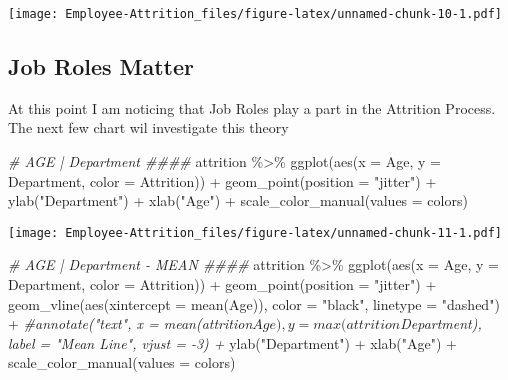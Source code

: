 \documentclass[
]{article}
\newenvironment{Shaded}{\begin{snugshade}}{\end{snugshade}}
\newcommand{\AttributeTok}[1]{\textcolor[rgb]{0.77,0.63,0.00}{#1}}
\newcommand{\CommentTok}[1]{\textcolor[rgb]{0.56,0.35,0.01}{\textit{#1}}}
\newcommand{\FunctionTok}[1]{\textcolor[rgb]{0.00,0.00,0.00}{#1}}
\newcommand{\NormalTok}[1]{#1}
\newcommand{\SpecialCharTok}[1]{\textcolor[rgb]{0.00,0.00,0.00}{#1}}
\newcommand{\StringTok}[1]{\textcolor[rgb]{0.31,0.60,0.02}{#1}}
\begin{document}
\texttt{[image: Employee-Attrition\_files/figure-latex/unnamed-chunk-10-1.pdf]}

\hypertarget{job-roles-matter}{%
\subsection{Job Roles Matter}\label{job-roles-matter}}

At this point I am noticing that Job Roles play a part in the Attrition
Process. The next few chart wil investigate this theory

\begin{Shaded}
\begin{Highlighting}[]
\CommentTok{\# AGE | Department \#\#\#\#}
\NormalTok{attrition }\SpecialCharTok{\%\textgreater{}\%} \FunctionTok{ggplot}\NormalTok{(}\FunctionTok{aes}\NormalTok{(}\AttributeTok{x =}\NormalTok{ Age, }\AttributeTok{y =}\NormalTok{ Department, }\AttributeTok{color =}\NormalTok{ Attrition)) }\SpecialCharTok{+}
  \FunctionTok{geom\_point}\NormalTok{(}\AttributeTok{position =} \StringTok{"jitter"}\NormalTok{) }\SpecialCharTok{+}
  \FunctionTok{ylab}\NormalTok{(}\StringTok{"Department"}\NormalTok{) }\SpecialCharTok{+}
  \FunctionTok{xlab}\NormalTok{(}\StringTok{"Age"}\NormalTok{) }\SpecialCharTok{+}
  \FunctionTok{scale\_color\_manual}\NormalTok{(}\AttributeTok{values =}\NormalTok{ colors)}
\end{Highlighting}
\end{Shaded}

\texttt{[image: Employee-Attrition\_files/figure-latex/unnamed-chunk-11-1.pdf]}

\begin{Shaded}
\begin{Highlighting}[]
\CommentTok{\# AGE  | Department  {-} MEAN \#\#\#\#}
\NormalTok{attrition }\SpecialCharTok{\%\textgreater{}\%} \FunctionTok{ggplot}\NormalTok{(}\FunctionTok{aes}\NormalTok{(}\AttributeTok{x =}\NormalTok{ Age, }\AttributeTok{y =}\NormalTok{ Department, }\AttributeTok{color =}\NormalTok{ Attrition)) }\SpecialCharTok{+}
  \FunctionTok{geom\_point}\NormalTok{(}\AttributeTok{position =} \StringTok{"jitter"}\NormalTok{) }\SpecialCharTok{+}
  \FunctionTok{geom\_vline}\NormalTok{(}\FunctionTok{aes}\NormalTok{(}\AttributeTok{xintercept =} \FunctionTok{mean}\NormalTok{(Age)), }\AttributeTok{color =} \StringTok{"black"}\NormalTok{, }\AttributeTok{linetype =} \StringTok{"dashed"}\NormalTok{) }\SpecialCharTok{+}
  \CommentTok{\#annotate("text", x = mean(attrition$Age), y = max(attrition$Department), label = "Mean Line", vjust = {-}3) +}
  \FunctionTok{ylab}\NormalTok{(}\StringTok{"Department"}\NormalTok{) }\SpecialCharTok{+}
  \FunctionTok{xlab}\NormalTok{(}\StringTok{"Age"}\NormalTok{) }\SpecialCharTok{+}
  \FunctionTok{scale\_color\_manual}\NormalTok{(}\AttributeTok{values =}\NormalTok{ colors)}
\end{Highlighting}
\end{Shaded}
\end{document}
